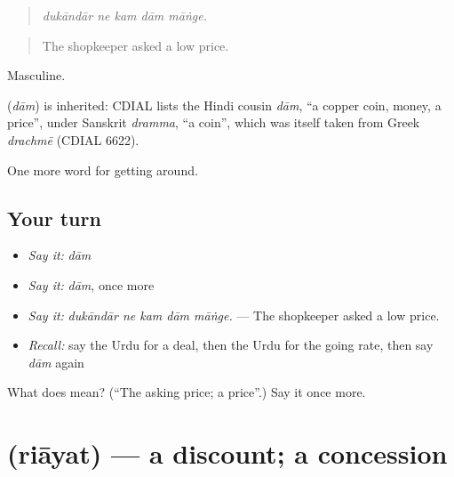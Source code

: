 \begin{quote}
    
\end{quote}

\begin{quote}
\emph{dukāndār ne kam dām māṅge.}
\end{quote}

\begin{quote}
The shopkeeper asked a low price.
\end{quote}

Masculine.

\begin{cousinweb}
\textbf{} (\emph{dām}) is inherited: CDIAL lists the Hindi cousin \emph{dām}, \textquotedblleft{}a copper coin, money, a price\textquotedblright{}, under Sanskrit \emph{dramma}, \textquotedblleft{}a coin\textquotedblright{}, which was itself taken from Greek \emph{drachmē} (CDIAL 6622).
\end{cousinweb}

\begin{grammarlens}[title={What you've built}]
One more word for getting around.
\end{grammarlens}

\subsection*{Your turn}
\begin{itemize}
\raggedright
  \item \emph{Say it:} \emph{dām}
  \item \emph{Say it:} \emph{dām}, once more
  \item \emph{Say it:} \emph{dukāndār ne kam dām māṅge.} — The shopkeeper asked a low price.
  \item \emph{Recall:} say the Urdu for a deal, then the Urdu for the going rate, then say \emph{dām} again
\end{itemize}

\begin{tcolorbox}[breakable,colback=teal!4,colframe=teal!35!black,title={Before you move on}]
What does  mean? (\textquotedblleft{}The asking price; a price\textquotedblright{}.) Say it once more.
\end{tcolorbox}
\section[\texorpdfstring{\ur{رعایت} (riāyat)}{رعایت (riāyat)}]{ (riāyat) — a discount; a concession}

